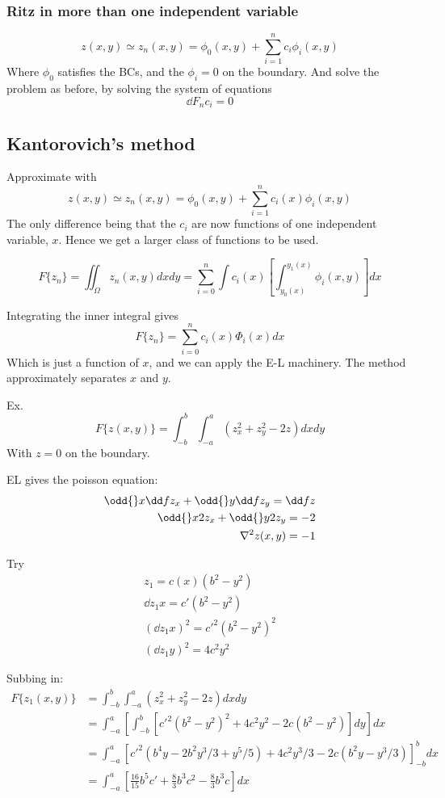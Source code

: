 \documentclass{X:/Documents/Coding/Latex/myassignment}
\begin{document}
\subsubsection{Ritz in more than one independent variable}
\[z(x,y) \simeq z_n(x,y) = \phi_0(x,y) + \sum_{i=1}^n c_i \phi_i (x,y)\]
Where $\phi_0$ satisfies the BCs, and the $\phi_i = 0$ on the boundary.
And solve the problem as before, by solving the system of equations
\[\dd{F_n}{c_i} = 0\]


\subsection{Kantorovich's method}
Approximate with
\[z(x,y) \simeq z_n(x,y) = \phi_0(x,y) + \sum_{i=1}^n c_i(x) \phi_i (x,y)\]
The only difference being that the $c_i$ are now functions of one independent variable, $x$. Hence we get a larger class of functions to be used.

\[F\{z_n\} = \iint_{\Omega} z_n(x,y) dx dy = \sum_{i=0}^n \int c_i(x) \left[\int _{y_0(x)}^{y_1(x)} \phi_i(x,y)\right] dx\]

Integrating the inner integral gives
\[F\{z_n\} = \sum_{i=0}^n c_i(x) \Phi_i(x) dx\]
Which is just a function of $x$, and we can apply the E-L machinery.
The method approximately separates $x$ and $y$.

Ex.
\[F\{z(x,y)\} = \int_{-b}^b \int_{-a}^a (z_x^2 + z_y^2 - 2z) dxdy\]
With $z=0$ on the boundary.

EL gives the poisson equation:
\begin{align*}
	\odd{}x \dd f{z_x} + \odd{}y \dd f{z_y} = \dd fz\\
	\odd{}x 2 z_x + \odd{}y 2z_y = -2\\
	\nabla^2 z(x,y) = -1
\end{align*}

Try
\begin{align*}
	z_1 = c(x)(b^2-y^2)\\
	\dd{z_1}{x} = c'(b^2-y^2)\\
	\left(\dd{z_1}{x}\right)^2 = c'^2 (b^2-y^2)^2\\
	\left(\dd{z_1}{y}\right)^2 = 4c^2 y^2
\end{align*}

Subbing in:
\begin{align*}
	F\{z_1(x,y)\} &= \int_{-b}^b \int_{-a}^a \left(z_x^2 + z_y^2 - 2z\right) dxdy\\
	&= \int_{-a}^a \left[\int_{-b}^b \left[c'^2 (b^2-y^2)^2 + 4c^2y^2 - 2c(b^2-y^2)\right]dy\right]dx\\
	&= \int_{-a}^a \left[c'^2 (b^4 y - 2b^2y^3/3 + y^5/5) + 4c^2 y^3/3 - 2c(b^2y - y^3/3)\right]_{-b}^b dx\\
	&= \int_{-a}^a \left[\frac{16}{15} b^5 c' + \frac83 b^3 c^2 - \frac83 b^3 c\right] dx
\end{align*}
\end{document}
